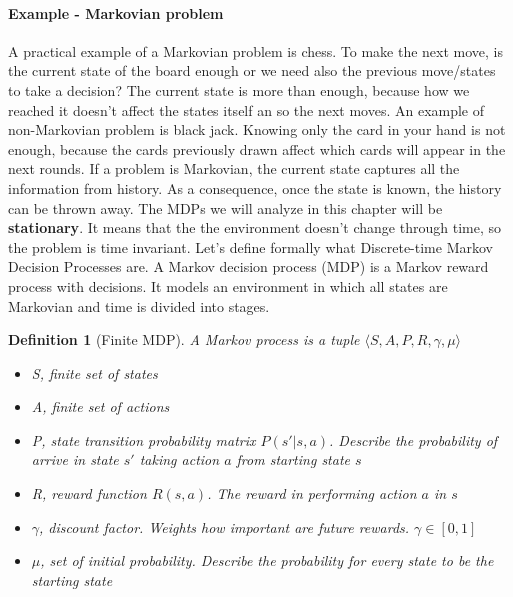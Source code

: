 \documentclass[main.tex]{subfiles}
\newtheorem{definition}{Definition}[section]
\begin{document}
\paragraph{Example - Markovian problem} A practical example of a Markovian problem is chess. To make the next move, is the current state of the board enough or we need also the previous move/states to take a decision? The current state is more than enough, because how we reached it doesn't affect the states itself an so the next moves. An example of non-Markovian problem is black jack. Knowing only the card in your hand is not enough, because the cards previously drawn affect which cards will appear in the next rounds.
\newline
\newline
If a problem is Markovian, the current state captures all the information from history. As a consequence, once the state is known, the history can be thrown away. The MDPs we will analyze in this chapter will be \textbf{stationary}\footnotemark. It means that the the environment doesn't change through time, so the problem is time invariant.
\newline
Let's define formally what Discrete-time Markov Decision Processes are.
A Markov decision process (MDP) is a Markov reward process with decisions. It models an environment in which all states are Markovian and time is divided into stages.
\newpage
\begin{definition}[Finite MDP]
A Markov process is a tuple $\langle S, A, P, R, \gamma, \mu \rangle$
\begin{itemize}
    \item S, finite set of states
    \item A, finite set of actions
    \item P, state transition probability matrix $P(s'|s,a)$. Describe the probability of arrive in state $s'$ taking action $a$ from starting state $s$
    \item R, reward function $R(s,a)$. The reward in performing action $a$ in $s$ 
    \item $\gamma$, discount factor. Weights how important are future rewards. $\gamma \in [0,1]$
    \item $\mu$, set of initial probability. Describe the probability for every state to be the starting state
\end{itemize}
\end{definition}
\end{document}
